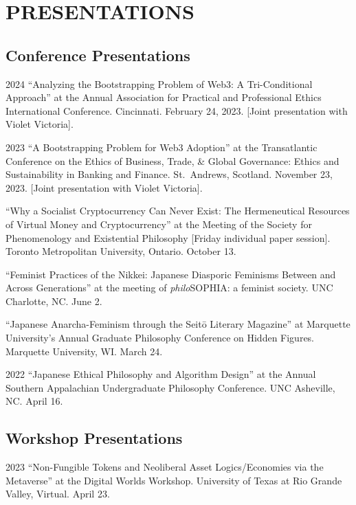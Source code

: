 \documentclass{article}
\begin{document}
\section*{\normalsize{PRESENTATIONS}}
\subsection*{\normalsize{Conference Presentations}}
\begin{tablist}
    \item[2024] \tab{}\enquote{Analyzing the Bootstrapping Problem of Web3: A Tri-Conditional Approach} at the  Annual Association for Practical and Professional Ethics International Conference. Cincinnati. February 24, 2023. [Joint presentation with Violet Victoria].
    \item[2023] \tab{}\enquote{A Bootstrapping Problem for Web3 Adoption} at the  Transatlantic Conference on the Ethics of Business, Trade, \& Global Governance: Ethics and Sustainability in Banking and Finance. St.~Andrews, Scotland. November 23, 2023. [Joint presentation with Violet Victoria].
    \item[] \tab{}\enquote{Why a Socialist Cryptocurrency Can Never Exist: The Hermeneutical Resources of Virtual Money and Cryptocurrency} at the  Meeting of the Society for Phenomenology and Existential Philosophy [Friday individual paper session]. Toronto Metropolitan University, Ontario. October 13.
    \item[] \tab{}\enquote{Feminist Practices of the Nikkei: Japanese Diasporic Feminisms Between and Across Generations} at the  meeting of \textit{philo}SOPHIA: a feminist society. UNC Charlotte, NC. June 2.
    \item[] \tab{}\enquote{Japanese Anarcha-Feminism through the Seitō Literary Magazine} at Marquette University's Annual Graduate Philosophy Conference on Hidden Figures. Marquette University, WI. March 24.
    \item[2022] \tab{}\enquote{Japanese Ethical Philosophy and Algorithm Design} at the  Annual Southern Appalachian Undergraduate Philosophy Conference. UNC Asheville, NC. April 16.
\end{tablist}
\subsection*{\normalsize{Workshop Presentations}}
\begin{tablist}
    \item[2023] \tab{}\enquote{Non-Fungible Tokens and Neoliberal Asset Logics/Economies via the Metaverse} at the Digital Worlds Workshop. University of Texas at Rio Grande Valley, Virtual. April 23.
\end{tablist}
\end{document}
